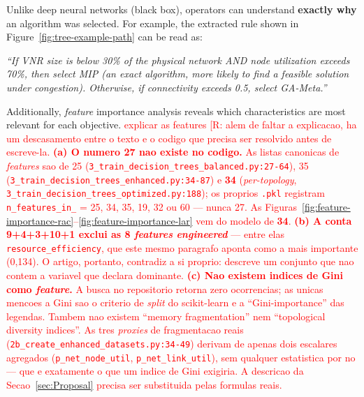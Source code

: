 \documentclass[runningheads]{llncs}
\begin{document}
Unlike deep neural networks (black box), operators can understand \textbf{exactly why} an algorithm was selected. For example, the extracted rule shown in Figure~\ref{fig:tree-example-path} can be read as:

\textit{``If VNR size is below 30\% of the physical network AND node utilization exceeds 70\%, then select MIP (an exact algorithm, more likely to find a feasible solution under congestion). Otherwise, if connectivity exceeds 0.5, select GA-Meta.''}

Additionally, \textit{feature} importance analysis reveals which characteristics are most relevant for each objective. \textcolor{red}{explicar as features} \textcolor{red}{[R: alem de faltar a explicacao, ha um descasamento entre o texto e o codigo que precisa ser resolvido antes de escreve-la.
\textbf{(a) O numero 27 nao existe no codigo.} As listas canonicas de \emph{features} sao de 25 (\texttt{3\_train\_decision\_trees\_balanced.py:27-64}), 35 (\texttt{3\_train\_decision\_trees\_enhanced.py:34-87}) e \textbf{34} (\emph{per-topology}, \texttt{3\_train\_decision\_trees\_optimized.py:188}); os proprios \texttt{.pkl} registram \texttt{n\_features\_in\_} = 25, 34, 35, 19, 32 ou 60 --- nunca 27. As Figuras~\ref{fig:feature-importance-rac}--\ref{fig:feature-importance-lar} vem do modelo de \textbf{34}.
\textbf{(b) A conta 9+4+3+10+1 exclui as 8 \emph{features} \emph{engineered}} --- entre elas \texttt{resource\_efficiency}, que este mesmo paragrafo aponta como a mais importante (0,134). O artigo, portanto, contradiz a si proprio: descreve um conjunto que nao contem a variavel que declara dominante.
\textbf{(c) Nao existem indices de Gini como \emph{feature}.} A busca no repositorio retorna zero ocorrencias; as unicas mencoes a Gini sao o criterio de \emph{split} do scikit-learn e a ``Gini-importance'' das legendas. Tambem nao existem ``memory fragmentation'' nem ``topological diversity indices''. As tres \emph{proxies} de fragmentacao reais (\texttt{2b\_create\_enhanced\_datasets.py:34-49}) derivam de apenas dois escalares agregados (\texttt{p\_net\_node\_util}, \texttt{p\_net\_link\_util}), sem qualquer estatistica por no --- que e exatamente o que um indice de Gini exigiria. A descricao da Secao~\ref{sec:Proposal} precisa ser substituida pelas formulas reais.
}
\end{document}
